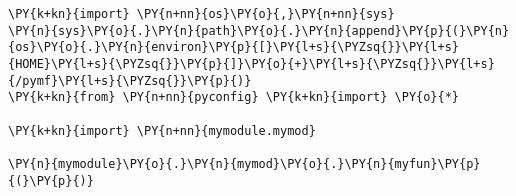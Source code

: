 \begin{Verbatim}[commandchars=\\\{\}]
\PY{k+kn}{import} \PY{n+nn}{os}\PY{o}{,}\PY{n+nn}{sys}
\PY{n}{sys}\PY{o}{.}\PY{n}{path}\PY{o}{.}\PY{n}{append}\PY{p}{(}\PY{n}{os}\PY{o}{.}\PY{n}{environ}\PY{p}{[}\PY{l+s}{\PYZsq{}}\PY{l+s}{HOME}\PY{l+s}{\PYZsq{}}\PY{p}{]}\PY{o}{+}\PY{l+s}{\PYZsq{}}\PY{l+s}{/pymf}\PY{l+s}{\PYZsq{}}\PY{p}{)}
\PY{k+kn}{from} \PY{n+nn}{pyconfig} \PY{k+kn}{import} \PY{o}{*}

\PY{k+kn}{import} \PY{n+nn}{mymodule.mymod}

\PY{n}{mymodule}\PY{o}{.}\PY{n}{mymod}\PY{o}{.}\PY{n}{myfun}\PY{p}{(}\PY{p}{)}
\end{Verbatim}
